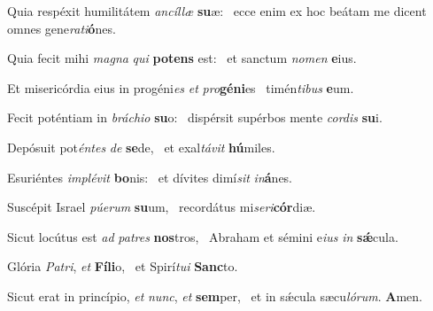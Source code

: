 \item Quia respéxit humilitátem \textit{ancíllæ} \textbf{su}æ:~\psstar{} ecce enim ex hoc beátam me dicent omnes gene\textit{rati}\textbf{ó}nes.

\item Quia fecit mihi \textit{magna} \textit{qui} \textbf{pot}\textbf{ens} est:~\psstar{} et sanctum \textit{nomen} \textbf{e}ius.

\item Et misericórdia eius in progéni\textit{es} \textit{et} \textit{pro}\textbf{gé}\textbf{ni}es~\psstar{} timén\textit{tibus} \textbf{e}um.

\item Fecit poténtiam in \textit{bráchio} \textbf{su}o:~\psstar{} dispérsit supérbos mente \textit{cordis} \textbf{su}i.

\item Depósuit pot\textit{éntes} \textit{de} \textbf{se}de,~\psstar{} et exal\textit{távit} \textbf{hú}miles.

\item Esuriéntes \textit{implévit} \textbf{bo}nis:~\psstar{} et dívites dimí\textit{sit} \textit{in}\textbf{á}nes.

\item Suscépit Israel \textit{púerum} \textbf{su}um,~\psstar{} recordátus mi\textit{seri}\textbf{cór}diæ.

\item Sicut locútus est \textit{ad} \textit{patres} \textbf{nos}tros,~\psstar{} Abraham et sémini e\textit{ius} \textit{in} \textbf{sǽ}cula.

\item Glória \textit{Patri}, \textit{et} \textbf{Fí}\textbf{li}o,~\psstar{} et Spirí\textit{tui} \textbf{Sanc}to.

\item Sicut erat in princípio, \textit{et} \textit{nunc}, \textit{et} \textbf{sem}per,~\psstar{} et in sǽcula sæcu\textit{lórum}. \textbf{A}men.